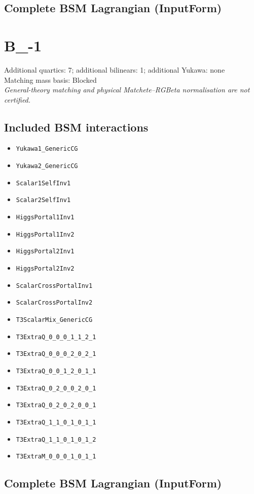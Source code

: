\documentclass[10pt,a4paper]{article}
\begin{document}
\subsection*{Complete BSM Lagrangian (InputForm)}

\clearpage
\section{B\_-1}
Additional quartics: 7; additional bilinears: 1; additional Yukawa: none\\
Matching mass basis: Blocked\\
\emph{General-theory matching and physical Matchete--RGBeta normalisation are not certified.}
\subsection*{Included BSM interactions}
\begin{itemize}
\item \texttt{Yukawa1\_GenericCG}
\item \texttt{Yukawa2\_GenericCG}
\item \texttt{Scalar1SelfInv1}
\item \texttt{Scalar2SelfInv1}
\item \texttt{HiggsPortal1Inv1}
\item \texttt{HiggsPortal1Inv2}
\item \texttt{HiggsPortal2Inv1}
\item \texttt{HiggsPortal2Inv2}
\item \texttt{ScalarCrossPortalInv1}
\item \texttt{ScalarCrossPortalInv2}
\item \texttt{T3ScalarMix\_GenericCG}
\item \texttt{T3ExtraQ\_0\_0\_0\_1\_1\_2\_1}
\item \texttt{T3ExtraQ\_0\_0\_0\_2\_0\_2\_1}
\item \texttt{T3ExtraQ\_0\_0\_1\_2\_0\_1\_1}
\item \texttt{T3ExtraQ\_0\_2\_0\_0\_2\_0\_1}
\item \texttt{T3ExtraQ\_0\_2\_0\_2\_0\_0\_1}
\item \texttt{T3ExtraQ\_1\_1\_0\_1\_0\_1\_1}
\item \texttt{T3ExtraQ\_1\_1\_0\_1\_0\_1\_2}
\item \texttt{T3ExtraM\_0\_0\_0\_1\_0\_1\_1}
\end{itemize}
\subsection*{Complete BSM Lagrangian (InputForm)}

\clearpage
\end{document}
